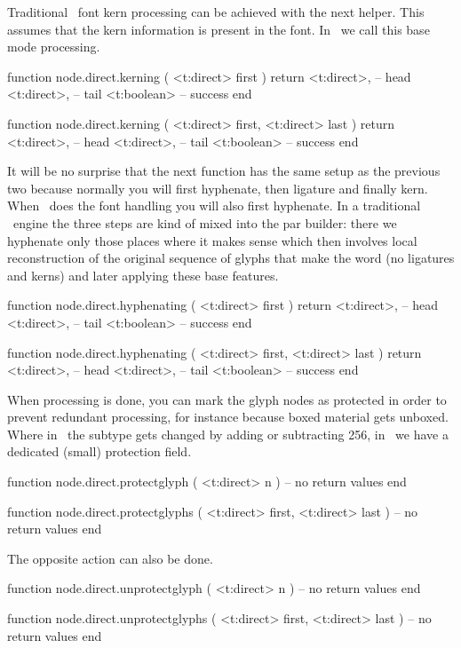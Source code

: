 Traditional \TEX\ font kern processing can be achieved with the next helper. This
assumes that the kern information is present in the font. In \CONTEXT\ we
call this base mode processing.

\starttyping[option=LUA]
function node.direct.kerning ( <t:direct> first )
    return
        <t:direct>, -- head
        <t:direct>, -- tail
        <t:boolean> -- success
end

function node.direct.kerning ( <t:direct> first, <t:direct> last )
    return
        <t:direct>, -- head
        <t:direct>, -- tail
        <t:boolean> -- success
end
\stoptyping

It will be no surprise that the next function has the same setup as the previous
two because normally you will first hyphenate, then ligature and finally kern.
When \LUA\ does the font handling you will also first hyphenate. In a traditional
\TEX\ engine the three steps are kind of mixed into the par builder: there we
hyphenate only those places where it makes sense which then involves local
reconstruction of the original sequence of glyphs that make the word (no
ligatures and kerns) and later applying these base features.

\starttyping[option=LUA]
function node.direct.hyphenating ( <t:direct> first )
    return
        <t:direct>, -- head
        <t:direct>, -- tail
        <t:boolean> -- success
end

function node.direct.hyphenating ( <t:direct> first, <t:direct> last )
    return
        <t:direct>, -- head
        <t:direct>, -- tail
        <t:boolean> -- success
end
\stoptyping

When processing is done, you can mark the glyph nodes as protected in order to
prevent redundant processing, for instance because boxed material gets unboxed.
Where in \LUATEX\ the subtype gets changed by adding or subtracting 256, in
\LUAMETATEX\ we have a dedicated (small) protection field.

\starttyping[option=LUA]
function node.direct.protectglyph ( <t:direct> n )
    -- no return values
end

function node.direct.protectglyphs ( <t:direct> first, <t:direct> last )
    -- no return values
end
\stoptyping

The opposite action can also be done.

\starttyping[option=LUA]
function node.direct.unprotectglyph ( <t:direct> n )
    -- no return values
end

function node.direct.unprotectglyphs ( <t:direct> first, <t:direct> last )
    -- no return values
end
\stoptyping


